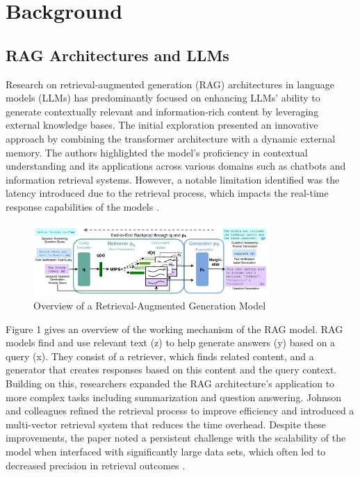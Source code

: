 \section{Background}

\subsection{RAG Architectures and LLMs}

Research on retrieval-augmented generation (RAG) architectures in language models (LLMs) has predominantly focused on enhancing LLMs' ability to generate contextually relevant and information-rich content by leveraging external knowledge bases. The initial exploration presented an innovative approach by combining the transformer architecture with a dynamic external memory. The authors highlighted the model's proficiency in contextual understanding and its applications across various domains such as chatbots and information retrieval systems. However, a notable limitation identified was the latency introduced due to the retrieval process, which impacts the real-time response capabilities of the models \parencite{lewis2020retrieval}. \\

\begin{figure}[H]
\centering
\includegraphics[width=0.8\textwidth]{Ref. 1.png}
\caption{Overview of a Retrieval-Augmented Generation Model \parencite{lewis2020retrieval}}
\end{figure}

Figure 1 gives an overview of the working mechanism of the RAG model. RAG models find and use relevant text (z) to help generate answers (y) based on a query (x). They consist of a retriever, which finds related content, and a generator that creates responses based on this content and the query context. \\

Building on this, researchers expanded the RAG architecture's application to more complex tasks including summarization and question answering. Johnson and colleagues refined the retrieval process to improve efficiency and introduced a multi-vector retrieval system that reduces the time overhead. Despite these improvements, the paper noted a persistent challenge with the scalability of the model when interfaced with significantly large data sets, which often led to decreased precision in retrieval outcomes \parencite{gao2023retrieval}.

